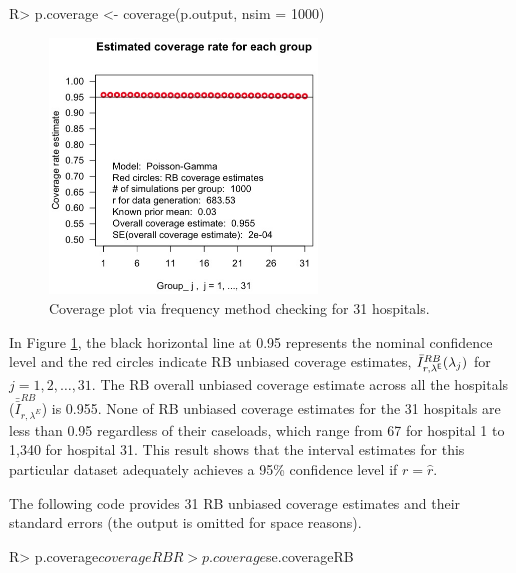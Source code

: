 \documentclass[article]{jss}
\begin{document}
\begin{CodeChunk}
\begin{CodeInput}
R> p.coverage <- coverage(p.output, nsim = 1000)
\end{CodeInput}
\end{CodeChunk}
\begin{figure}[h] 
\begin{center}
\includegraphics[width = 2.8in]{hospital2.png}
\caption{Coverage plot via frequency method checking for 31 hospitals.}
\label{fig:hospitalcoverage}
\end{center}
\end{figure}

In Figure \ref{fig:hospitalcoverage}, the black horizontal line at 0.95 represents the nominal confidence level  and the red circles indicate RB unbiased coverage estimates, $\bar{I}^{RB}_{r, \lambda^{\mathsf{E}}}(\lambda_j)$ for $j=1, 2, \ldots, 31$. The  RB overall unbiased coverage estimate across all the hospitals ($\bar{\bar{I}}^{RB}_{r, \lambda^E}$) is 0.955. None of RB unbiased coverage estimates for the 31 hospitals are less than 0.95 regardless of their caseloads, which range from 67 for hospital 1 to 1,340 for hospital 31. This result shows that the interval estimates for this particular dataset adequately achieves a 95\% confidence level if $r=\hat{r}$.


The following code provides 31 RB unbiased coverage estimates and their standard errors  (the output is omitted for space reasons).
\begin{CodeChunk}
\begin{CodeInput}
R> p.coverage$coverageRB
R> p.coverage$se.coverageRB
\end{CodeInput}
\end{CodeChunk}
\end{document}
